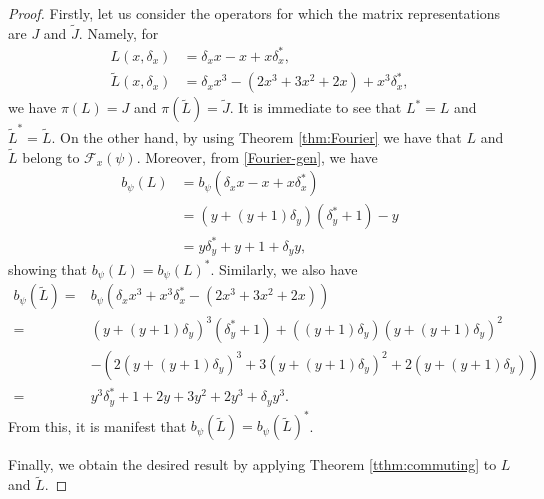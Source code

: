 \documentclass[11pt]{amsart}
\theoremstyle{plain}
\theoremstyle{named}
\def \wt {\widetilde}
\begin{document}
\begin{proof}
Firstly, let us consider the operators for which the matrix representations are $J$ and $\wt J$. Namely, for 
\begin{align*}
    L(x,\delta_x)&=\delta_x x-x+x \delta_x^*,\\
    \wt L(x,\delta_x)&=\delta_x x^3-(2x^3+3x^2+2x)+x^3 \delta_x^*,
\end{align*}
we have $\pi(L)=J$ and $\pi(\wt L)=\wt J$.
It is immediate to see that  $L^*=L$ and $\wt L^*=\wt L$. On the other hand, by using Theorem \ref{thm:Fourier} we have that $L$ and $\wt L$ belong to $\mathcal F_x(\psi)$. Moreover, from \eqref{Fourier-gen}, we have 
\begin{align*}
b_\psi(L)
&=b_\psi(\delta_x x-x+x \delta_x^*)\\
&=(y + (y+1)\delta_y)(\delta_y^*+1)-y\\
&=y\delta_y^*+ y+1+\delta_y y,
\end{align*}
showing that $b_\psi(L)=b_\psi(L)^*$. Similarly, we also have
\begin{align*}
b_\psi(\wt L)=&b_\psi(\delta_x x^3+x^3 \delta_x^*-(2x^3+3x^2+2x))
\\
=&(y + (y+1)\delta_y)^3(\delta_y^*+1)  
+ ((y+1)\delta_y)(y + (y+1)\delta_y)^2
\\
&-(2(y + (y+1)\delta_y)^3+3(y + (y+1)\delta_y)^2+2(y + (y+1)\delta_y))
\\
=&y^3\delta_y^*+1 + 2 y + 3 y^2 + 2 y^3+\delta_y y^3.
\end{align*}
From this, it is manifest that $b_\psi(\wt L)=b_\psi(\wt L)^*$.

Finally, we obtain the desired result by applying Theorem \ref{tthm:commuting} to $L$ and $\wt L$.
\end{proof}
\end{document}
